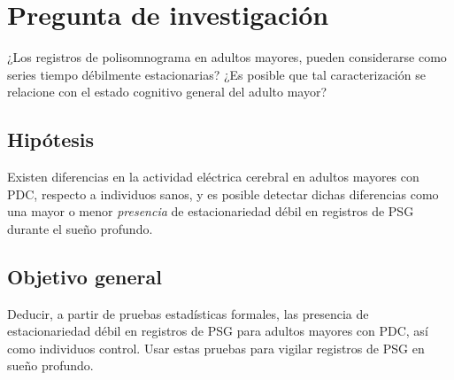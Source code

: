 

\section{Pregunta de investigación}

¿Los registros de polisomnograma en adultos mayores, pueden considerarse como series tiempo 
débilmente estacionarias?
%
¿Es posible que tal caracterización se relacione con el estado cognitivo general del adulto mayor?


\subsection{Hipótesis}

Existen diferencias en la actividad eléctrica cerebral en adultos mayores con PDC, respecto a 
individuos sanos, y es posible detectar dichas diferencias como una mayor o menor 
\textit{presencia} de estacionariedad débil en registros de PSG durante el sueño profundo.


\subsection{Objetivo general}

Deducir, a partir de pruebas estadísticas formales, las presencia de estacionariedad débil en
registros de PSG para adultos mayores con PDC, así como individuos control.
Usar estas pruebas para vigilar registros de PSG en sueño profundo.


